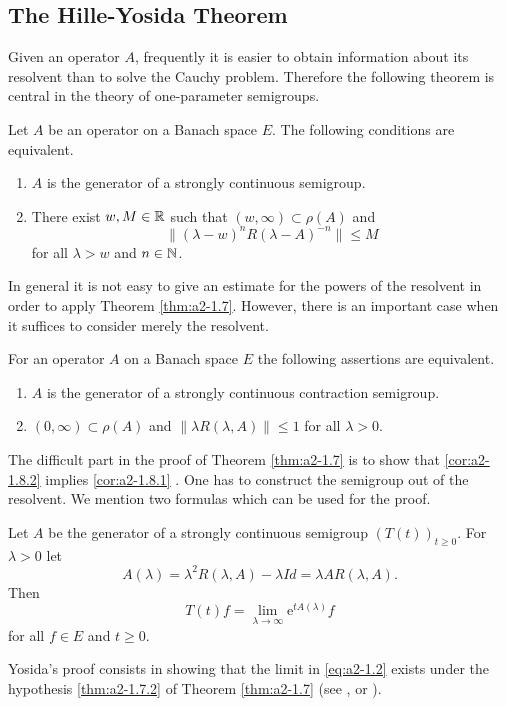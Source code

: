 \subsection{The Hille-Yosida Theorem} \label{subsec:a2-1.se3}%
Given an operator $A$, frequently it is easier to obtain information about its resolvent than to solve the Cauchy problem.
Therefore the following theorem is central in the theory of one-parameter semigroups.
\begin{theorem}\label{thm:a2-1.7}
Let $A$ be an operator on a Banach space $E$.
The following conditions are equivalent.
\begin{enumerate}[\upshape (a)]
\item \label{thm:a2-1.7.1}
$A$ is the generator of a strongly continuous semigroup.
\item \label{thm:a2-1.7.2}
There exist $w, M \in \mathbb{R}$ such that $(w,\infty) \subset \rho(A)$ and
\[
    \| {(\lambda - w)^{n}} R(\lambda-A)^{-n}\| \leq M 
\]
for all $\lambda > w$ and $n \in \mathbb{N}$.
\end{enumerate}
\end{theorem}
In general it is not easy to give an estimate for the powers of the resolvent in order to apply Theorem \ref{thm:a2-1.7}. 
However, there is an important case when it suffices to consider merely the resolvent.
\begin{corollary}\label{cor:a2-1.8}
For an operator $A$ on a Banach space $E$ the following assertions are equivalent.
\begin{enumerate}[\upshape (a)]
\item \label{cor:a2-1.8.1}
$A$ is the generator of a strongly continuous contraction semigroup.
\item \label{cor:a2-1.8.2}
$(0,\infty) \subset \rho(A)$ and $\|\lambda R(\lambda,A)\| \leq 1$ for all $\lambda > 0$.
\end{enumerate}
\end{corollary}
The difficult part in the proof of Theorem \ref{thm:a2-1.7}   is to show that \ref{cor:a2-1.8.2}   implies \ref{cor:a2-1.8.1}  . 
One has to construct the semigroup out of the resolvent.
We mention two formulas which can be used for the proof.
\begin{proposition}\label{prop:a2-1.9}
Let $A$ be the generator of a strongly continuous semigroup
$(T(t))_{t \geq 0}$.
For $\lambda > 0$ let 
\[
A(\lambda) = \lambda^{2} R(\lambda,A)-\lambda Id  =\lambda A R(\lambda,A).
\]
Then
\begin{equation}\label{eq:a2-1.2}
    T(t)f = \lim_{\lambda \to \infty} \mathrm{e}^{tA(\lambda)}f
\end{equation}
for all $f \in E$ and $t \geq 0$.
\end{proposition}
Yosida's proof consists in showing that the limit in \eqref{eq:a2-1.2} exists under the hypothesis  \ref{thm:a2-1.7.2} of Theorem  \ref{thm:a2-1.7}  
(see \citet{davies:1980}, \citet{goldstein:1985b} or \citet{pazy:1983}).

